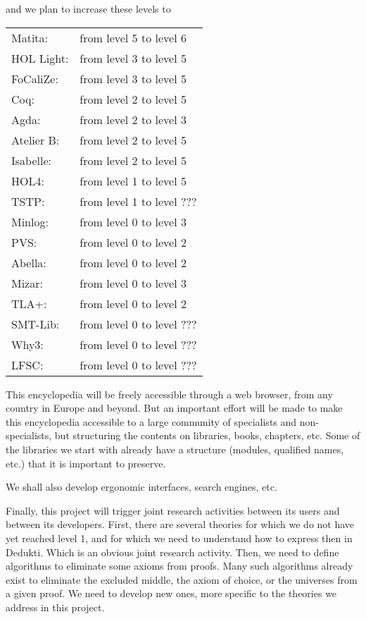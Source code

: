 and we plan to increase these levels to 

\begin{tabular}{ll}
Matita:& from level 5 to level 6\\
HOL Light:& from level 3 to level 5\\
FoCaliZe:& from level 3 to level 5\\
Coq:& from level 2 to level 5\\
Agda:& from level 2 to level 3\\
Atelier B:& from level 2 to level 5\\
Isabelle:& from level 2 to level 5\\
HOL4:& from level 1 to level 5\\
TSTP:& from level 1 to level ???\\
Minlog:& from level 0 to level 3\\
PVS:& from level 0 to level 2\\
Abella:& from level 0 to level 2\\
Mizar:& from level 0 to level 3\\
TLA+:& from level 0 to level 2\\
SMT-Lib:& from level 0 to level ???\\
Why3:& from level 0 to level ???\\
LFSC:& from level 0 to level ???\\

\end{tabular}

This encyclopedia will be freely accessible through a web browser,
from any country in Europe and beyond. But an important effort will be
made to make this encyclopedia accessible to a large community of
specialists and non-specialists, but structuring the contents on
libraries, books, chapters, etc. Some of the libraries we start with
already have a structure (modules, qualified names, etc.) that it is
important to preserve.

We shall also develop ergonomic interfaces, search engines, etc. 


Finally, this project will trigger joint research activities between
its users and between its developers.  First, there are several
theories for which we do not have yet reached level 1, and for which
we need to understand how to express then in {\sf Dedukti}. Which is
an obvious joint research activity. Then, we need to define algorithms
to eliminate some axioms from proofs. Many such algorithms already
exist to eliminate the excluded middle, the axiom of choice, or the universes
from a given proof. We need to develop new ones, more specific to the theories
we address in this project.

